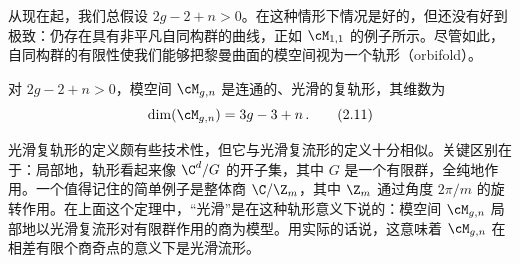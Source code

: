 
从现在起，我们总假设 $2g-2+n>0$。在这种情形下情况是好的，但还没有好到极致：仍存在具有非平凡自同构群的曲线，正如 $\cM_{1,1}$ 的例子所示。尽管如此，自同构群的有限性使我们能够把黎曼曲面的模空间视为一个轨形（orbifold）。

\begin{theorem}[2.2]
  对 $2g-2+n>0$，模空间 $\cM_{g,n}$ 是连通的、光滑的复轨形，其维数为
  \begin{equation}
    \dim(\cM_{g,n})=3g-3+n\,.
    \tag{2.11}
  \end{equation}
\end{theorem}

光滑复轨形的定义颇有些技术性，但它与光滑复流形的定义十分相似。关键区别在于：局部地，轨形看起来像 $\C^d/G$ 的开子集，其中 $G$ 是一个有限群，全纯地作用。一个值得记住的简单例子是整体商 $\C/\Z_m$，其中 $\Z_m$ 通过角度 $2\pi/m$ 的旋转作用。在上面这个定理中，“光滑”是在这种轨形意义下说的：模空间 $\cM_{g,n}$ 局部地以光滑复流形对有限群作用的商为模型。用实际的话说，这意味着 $\cM_{g,n}$ 在相差有限个商奇点的意义下是光滑流形。

